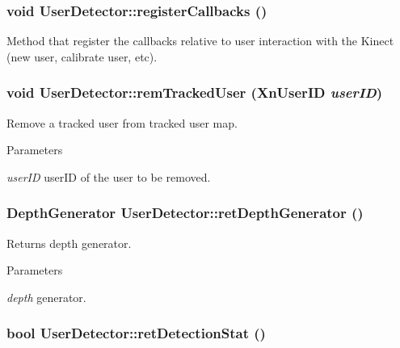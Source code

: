 \hypertarget{classUserDetector_ac07661d3e60486c7ef25c2569a38d514}{
\subsubsection[{registerCallbacks}]{\setlength{\rightskip}{0pt plus 5cm}void UserDetector::registerCallbacks ()}}
\label{classUserDetector_ac07661d3e60486c7ef25c2569a38d514}
Method that register the callbacks relative to user interaction with the Kinect (new user, calibrate user, etc). \hypertarget{classUserDetector_a896c7f8c005eb192fe0337688c167ca6}{
\subsubsection[{remTrackedUser}]{\setlength{\rightskip}{0pt plus 5cm}void UserDetector::remTrackedUser (XnUserID {\em userID})}}
\label{classUserDetector_a896c7f8c005eb192fe0337688c167ca6}
Remove a tracked user from tracked user map. 
\begin{DoxyParams}{Parameters}
\item[{\em userID}]userID of the user to be removed. \end{DoxyParams}
\hypertarget{classUserDetector_a5d8f0abf78b9b9b9d3b028f99ffe7c2b}{
\subsubsection[{retDepthGenerator}]{\setlength{\rightskip}{0pt plus 5cm}DepthGenerator UserDetector::retDepthGenerator ()}}
\label{classUserDetector_a5d8f0abf78b9b9b9d3b028f99ffe7c2b}
Returns depth generator. 
\begin{DoxyParams}{Parameters}
\item[{\em depth}]generator. \end{DoxyParams}
\hypertarget{classUserDetector_ac7b298a32601799b1750e8d5d72067fa}{
\subsubsection[{retDetectionStat}]{\setlength{\rightskip}{0pt plus 5cm}bool UserDetector::retDetectionStat ()}}
